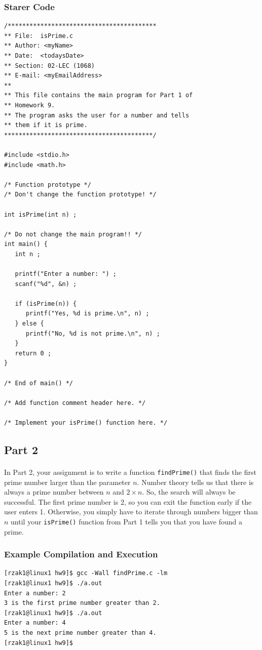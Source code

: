 \documentclass[letter,11pt]{article}
\begin{document}
\subsubsection*{Starer Code}
\begin{verbatim}
/*****************************************
** File:  isPrime.c
** Author: <myName>
** Date:  <todaysDate>
** Section: 02-LEC (1068)
** E-mail: <myEmailAddress>
**
** This file contains the main program for Part 1 of
** Homework 9.
** The program asks the user for a number and tells
** them if it is prime.
*****************************************/

#include <stdio.h>
#include <math.h>

/* Function prototype */
/* Don't change the function prototype! */

int isPrime(int n) ;

/* Do not change the main program!! */
int main() {
   int n ;

   printf("Enter a number: ") ;
   scanf("%d", &n) ;

   if (isPrime(n)) {
      printf("Yes, %d is prime.\n", n) ;
   } else {
      printf("No, %d is not prime.\n", n) ;
   }
   return 0 ;
}

/* End of main() */

/* Add function comment header here. */

/* Implement your isPrime() function here. */
\end{verbatim}

\subsection*{Part 2}
\paragraph{}In Part 2, your assignment is to write a function \texttt{findPrime()} that finds the first prime number larger than the parameter $n$. Number theory tells us that there is always a prime number between $n$ and $2 \times n$. So, the search will always be successful. The first prime number is 2, so you can exit the function early if the user enters 1. Otherwise, you simply have to iterate through numbers bigger than $n$ until your \texttt{isPrime()} function from Part 1 tells you that you have found a prime.

\subsubsection*{Example Compilation and Execution}
\begin{verbatim}
[rzak1@linux1 hw9]$ gcc -Wall findPrime.c -lm
[rzak1@linux1 hw9]$ ./a.out
Enter a number: 2
3 is the first prime number greater than 2.
[rzak1@linux1 hw9]$ ./a.out
Enter a number: 4
5 is the next prime number greater than 4.
[rzak1@linux1 hw9]$
\end{verbatim}
\end{document}
